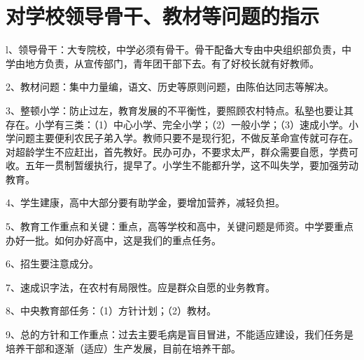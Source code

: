 \section[对学校领导骨干、教材等问题的指示（一九五三年）]{对学校领导骨干、教材等问题的指示}


l、领导骨干：大专院校，中学必须有骨干。骨干配备大专由中央组织部负责，中学由地方负责，从宣传部门，青年团干部下去。有了好校长就有好教师。

2、教材问题：集中力量编，语文、历史等原则问题，由陈伯达同志等解决。

3、整顿小学：防止过左，教育发展的不平衡性，要照顾农村特点。私塾也要让其存在。小学有三类：（1）中心小学、完全小学；（2）一般小学；（3）速成小学。小学问题主要便利农民子弟入学。教师只要不是现行犯，不做反革命宣传就可存在。对超龄学生不应赶出，首先教好。民办可办，不要求太严，群众需要自愿，学费可收。五年一贯制暂缓执行，提早了。小学生不能都升学，这不叫失学，要加强劳动教育。

4、学生建康，高中大部分要有助学金，要增加营养，减轻负担。

5、教育工作重点和关键：重点，高等学校和高中，关键问题是师资。中学要重点办好一批。如何办好高中，这是我们的重点任务。

6、招生要注意成分。

7、速成识字法，在农村有局限性。应是群众自愿的业务教育。

8、中央教育部任务：（1）方针计划；（2）教材。

9、总的方针和工作重点：过去主要毛病是盲目冒进，不能适应建设，我们任务是培养干部和逐渐（适应）生产发展，目前在培养干部。


